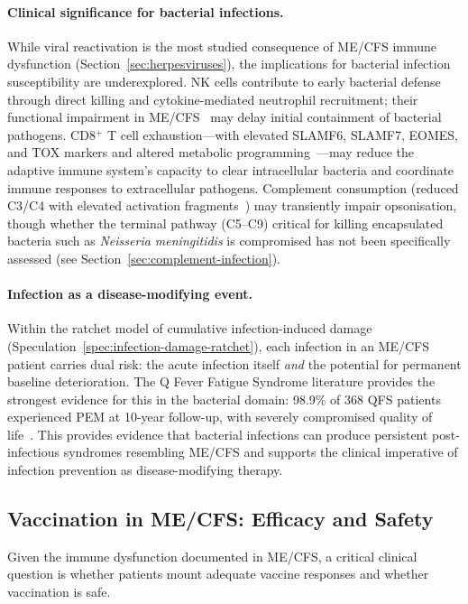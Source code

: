 \paragraph{Clinical significance for bacterial infections.}
While viral reactivation is the most studied consequence of ME/CFS immune dysfunction (Section~\ref{sec:herpesviruses}), the implications for bacterial infection susceptibility are underexplored. NK cells contribute to early bacterial defense through direct killing and cytokine-mediated neutrophil recruitment; their functional impairment in ME/CFS~\cite{Caligiuri1987nk} may delay initial containment of bacterial pathogens. CD8$^+$ T cell exhaustion---with elevated SLAMF6, SLAMF7, EOMES, and TOX markers and altered metabolic programming~\cite{iu2024tcell_exhaustion}---may reduce the adaptive immune system's capacity to clear intracellular bacteria and coordinate immune responses to extracellular pathogens. Complement consumption (reduced C3/C4 with elevated activation fragments~\cite{EatonFitch2019}) may transiently impair opsonisation, though whether the terminal pathway (C5--C9) critical for killing encapsulated bacteria such as \textit{Neisseria meningitidis} is compromised has not been specifically assessed (see Section~\ref{sec:complement-infection}).

\paragraph{Infection as a disease-modifying event.}
Within the ratchet model of cumulative infection-induced damage (Speculation~\ref{spec:infection-damage-ratchet}), each infection in an ME/CFS patient carries dual risk: the acute infection itself \emph{and} the potential for permanent baseline deterioration. The Q Fever Fatigue Syndrome literature provides the strongest evidence for this in the bacterial domain: 98.9\% of 368 QFS patients experienced PEM at 10-year follow-up, with severely compromised quality of life~\cite{Spronk2023qfever}. This provides evidence that bacterial infections can produce persistent post-infectious syndromes resembling ME/CFS and supports the clinical imperative of infection prevention as disease-modifying therapy.

\subsection{Vaccination in ME/CFS: Efficacy and Safety}
\label{sec:vaccination-mecfs}

Given the immune dysfunction documented in ME/CFS, a critical clinical question is whether patients mount adequate vaccine responses and whether vaccination is safe.

